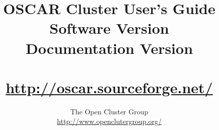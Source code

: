 %
%
%

\title{OSCAR Cluster User's Guide \\
Software Version \oscarversion \\
Documentation Version \docsversion \\
\ \\
\url{http://oscar.sourceforge.net/} \\
}

\author{The Open Cluster Group \\
\url{http://www.openclutergroup.org/}}
\maketitle
